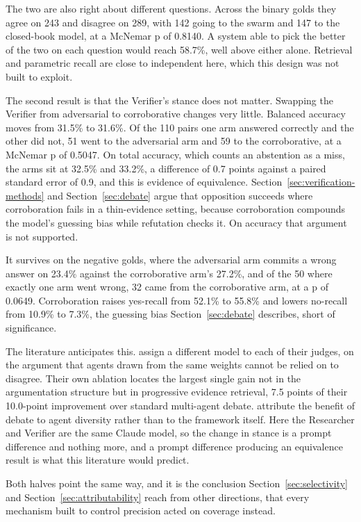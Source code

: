 The two are also right about different questions. Across the binary golds they agree on 243 and disagree on 289, with 142 going to the swarm and 147 to the closed-book model, at a McNemar p of 0.8140. A system able to pick the better of the two on each question would reach 58.7\%, well above either alone. Retrieval and parametric recall are close to independent here, which this design was not built to exploit.

The second result is that the Verifier's stance does not matter. Swapping the Verifier from adversarial to corroborative changes very little. Balanced accuracy moves from 31.5\% to 31.6\%. Of the 110 pairs one arm answered correctly and the other did not, 51 went to the adversarial arm and 59 to the corroborative, at a McNemar p of 0.5047. On total accuracy, which counts an abstention as a miss, the arms sit at 32.5\% and 33.2\%, a difference of 0.7 points against a paired standard error of 0.9, and this is evidence of equivalence. Section~\ref{sec:verification-methods} and Section~\ref{sec:debate} argue that opposition succeeds where corroboration fails in a thin-evidence setting, because corroboration compounds the model's guessing bias while refutation checks it. On accuracy that argument is not supported.

It survives on the negative golds, where the adversarial arm commits a wrong answer on 23.4\% against the corroborative arm's 27.2\%, and of the 50 where exactly one arm went wrong, 32 came from the corroborative arm, at a p of 0.0649. Corroboration raises yes-recall from 52.1\% to 55.8\% and lowers no-recall from 10.9\% to 7.3\%, the guessing bias Section~\ref{sec:debate} describes, short of significance.

The literature anticipates this. \citet{chowdhury2026} assign a different model to each of their judges, on the argument that agents drawn from the same weights cannot be relied on to disagree. Their own ablation locates the largest single gain not in the argumentation structure but in progressive evidence retrieval, 7.5 points of their 10.0-point improvement over standard multi-agent debate. \citet{zhu2026} attribute the benefit of debate to agent diversity rather than to the framework itself. Here the Researcher and Verifier are the same Claude model, so the change in stance is a prompt difference and nothing more, and a prompt difference producing an equivalence result is what this literature would predict.

Both halves point the same way, and it is the conclusion Section~\ref{sec:selectivity} and Section~\ref{sec:attributability} reach from other directions, that every mechanism built to control precision acted on coverage instead.

